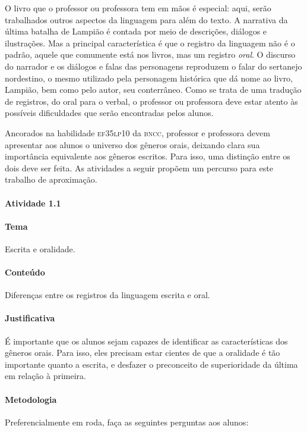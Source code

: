 \documentclass[11pt]{extarticle}
\begin{document}

O livro que o professor ou professora tem em mãos é especial:
aqui, serão trabalhados outros aspectos da linguagem para além do texto.
A narrativa da última batalha de Lampião é contada por meio de descrições, diálogos
e ilustrações. Mas a principal característica é que o registro da linguagem não é
o padrão, aquele que comumente está nos livros, mas um registro \textit{oral}.
O discurso do narrador e os diálogos e falas das personagens reproduzem o falar
do sertanejo nordestino, o mesmo utilizado pela personagem histórica que dá nome 
ao livro, Lampião, bem como pelo autor, seu conterrâneo. 
Como se trata de uma tradução de registros, do oral para o verbal, o professor
ou professora deve estar atento às possíveis dificuldades que serão encontradas pelos alunos. 

Ancorados na habilidade \textsc{ef35lp10} da \textsc{bncc}, professor e professora devem apresentar aos
alunos o universo dos gêneros orais, deixando clara sua importância equivalente aos
gêneros escritos. Para isso, uma distinção entre os dois deve ser feita. 
As atividades a seguir propõem um percurso para este trabalho de aproximação. 


\paragraph{Atividade 1.1}


\paragraph{Tema} Escrita e oralidade.


\paragraph{Conteúdo} Diferenças entre os registros da linguagem escrita e oral. 


\paragraph{Justificativa} É importante que os alunos sejam capazes de
identificar as características dos gêneros orais. Para isso, 
eles precisam estar cientes de que a oralidade é tão importante quanto a escrita,
e desfazer o preconceito de superioridade da última em relação à primeira.


\paragraph{Metodologia} Preferencialmente em roda, faça as seguintes perguntas aos alunos: 
\end{document}
